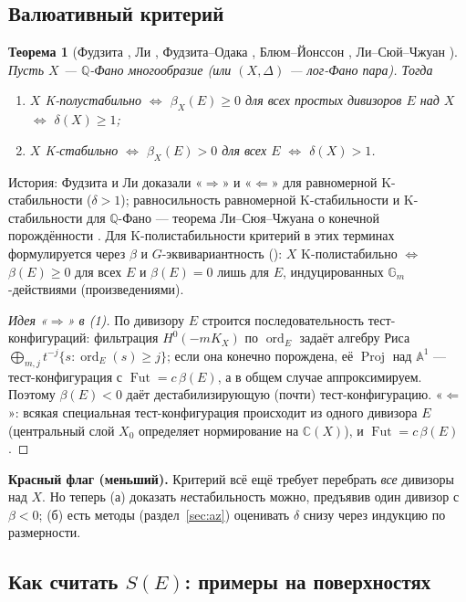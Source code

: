 \documentclass[11pt,a4paper]{article}
\theoremstyle{plain}
\newtheorem{theorem}{Теорема}[section]
\theoremstyle{definition}
\theoremstyle{remark}
\renewcommand{\C}{\mathbb{C}}
\newcommand{\Q}{\mathbb{Q}}
\newcommand{\A}{\mathbb{A}}
\newcommand{\Gm}{\mathbb{G}_m}
\DeclareMathOperator{\ord}{ord}
\DeclareMathOperator{\Fut}{Fut}
\DeclareMathOperator{\Proj}{Proj}
\begin{document}
\subsection{Валюативный критерий}

\begin{theorem}[{Фудзита \cite{Fuj19b}, Ли \cite{Li17}, Фудзита--Одака \cite{FO18}, Блюм--Йонссон \cite{BJ}, Ли--Сюй--Чжуан \cite{LXZ}}]\label{thm:valuative}
Пусть $X$ --- $\Q$-Фано многообразие (или $(X,\Delta)$ --- лог-Фано пара). Тогда
\begin{enumerate}
\item $X$ K-полустабильно $\iff$ $\beta_X(E)\ge0$ для всех простых дивизоров $E$ над $X$
$\iff$ $\delta(X)\ge1$;
\item $X$ K-стабильно $\iff$ $\beta_X(E)>0$ для всех $E$ $\iff$ $\delta(X)>1$.
\end{enumerate}
\end{theorem}

История: Фудзита и Ли доказали «$\Rightarrow$» и «$\Leftarrow$» для равномерной K-стабильности
($\delta>1$); равносильность равномерной K-стабильности и K-стабильности для $\Q$-Фано ---
теорема Ли--Сюя--Чжуана о конечной порождённости \cite{LXZ}. Для K-полистабильности критерий в
этих терминах формулируется через $\beta$ и $G$-эквивариантность (\cite{Zhu21}): $X$
K-полистабильно $\iff$ $\beta(E)\ge0$ для всех $E$ и $\beta(E)=0$ лишь для $E$, индуцированных
$\Gm$-действиями (произведениями).

\begin{proof}[Идея «$\Rightarrow$» в (1)]
По дивизору $E$ строится последовательность тест-конфигураций: фильтрация $H^0(-mK_X)$ по
$\ord_E$ задаёт алгебру Риса $\bigoplus_{m,j}t^{-j}\{s:\ord_E(s)\ge j\}$; если она конечно
порождена, её $\Proj$ над $\A^1$ --- тест-конфигурация с $\Fut=c\,\beta(E)$, а в общем случае
аппроксимируем. Поэтому $\beta(E)<0$ даёт дестабилизирующую (почти) тест-конфигурацию.
«$\Leftarrow$»: всякая специальная тест-конфигурация происходит из одного дивизора $E$ (центральный
слой $X_0$ определяет нормирование на $\C(X)$), и $\Fut=c\,\beta(E)$.
\end{proof}

\textbf{Красный флаг (меньший).} Критерий всё ещё требует перебрать \emph{все} дивизоры над $X$.
Но теперь (а) доказать \emph{не}стабильность можно, предъявив один дивизор с $\beta<0$; (б) есть
методы (раздел~\ref{sec:az}) оценивать $\delta$ снизу через индукцию по размерности.

\subsection{Как считать $S(E)$: примеры на поверхностях}
\end{document}
